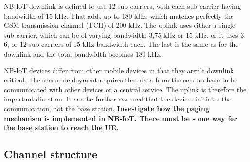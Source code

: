 \documentclass[10pt,a4paper,titlepage,twoside]{article}
\newcommand{\hghlght}[1]{\textbf{\color{ymaorng} #1}}
\newcommand{\point}[1]{\textbf{\color{ymared} #1}}
\begin{document}
NB-IoT downlink is defined to use 12 sub-carriers, with each sub-carrier having bandwidth of 15 kHz. That adds up to 180 kHz, which matches perfectly the GSM transmission channel (TCH) of 200 kHz. The uplink uses either a single sub-carrier, which can be of varying bandwidth: 3,75 kHz or 15 kHz, or it uses 3, 6, or 12 sub-carriers of 15 kHz bandwidth each\cite{3gpp}. The last is the same as for the downlink and the total bandwidth becomes 180 kHz.

NB-IoT devices differ from other mobile devices in that they aren't downlink critical. The sensor deployment requires that data from the sensors have to be communicated with other devices or a central service. The uplink is therefore the important direction. It can be further assumed that the devices initiates the communication, not the base station. \hghlght{Investigate how the paging mechanism is implemented in NB-IoT. There must be some way for the base station to reach the UE.}





\subsection{Channel structure}
\end{document}
